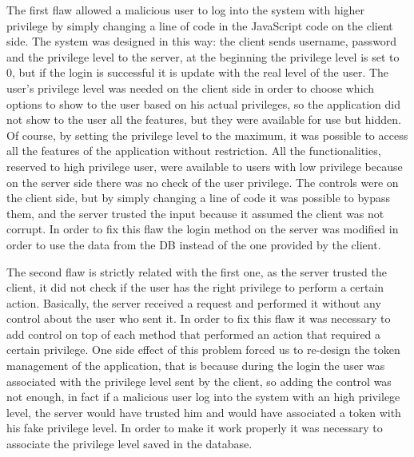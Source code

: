 The first flaw allowed a malicious user to log into the system with higher privilege by simply changing a line of code in the JavaScript code on the client side.\newline
The system was designed in this way: the client sends username, password and the privilege level to the server, at the beginning the privilege level is set to 0, but if the login is successful it is update with the real level of the user.\newline
The user’s privilege level was needed on the client side in order to choose which options to show to the user based on his actual privileges, so the application did not show to the user all the features, but they were available for use but hidden.\newline
Of course, by setting the privilege level to the maximum, it was possible to access all the features of the application without restriction.\newline
All the functionalities, reserved to high privilege user, were available to users with low privilege because on the server side there was no check of the user privilege.\newline
The controls were on the client side, but by simply changing a line of code it was possible to bypass them, and the server trusted the input because it assumed the client was not corrupt.\newline
In order to fix this flaw the login method on the server was modified in order to use the data from the DB instead of the one provided by the client.\newline

The second flaw is strictly related with the first one, as the server trusted the client, it did not check if the user has the right privilege to perform a certain action.\newline
Basically, the server received a request and performed it without any control about the user who sent it.\newline
In order to fix this flaw it was necessary to add control on top of each method that performed an action that required a certain privilege.\newline
One side effect of this problem forced us to re-design the token management of the application, that is because during the login the user was associated with the privilege level sent by the client, so adding the control was not enough, in fact if a malicious user log into the system with an high privilege level, the server would have trusted him and would have associated a token with his fake privilege level.\newline
In order to make it work properly it was necessary to associate the privilege level saved in the database.\newline

